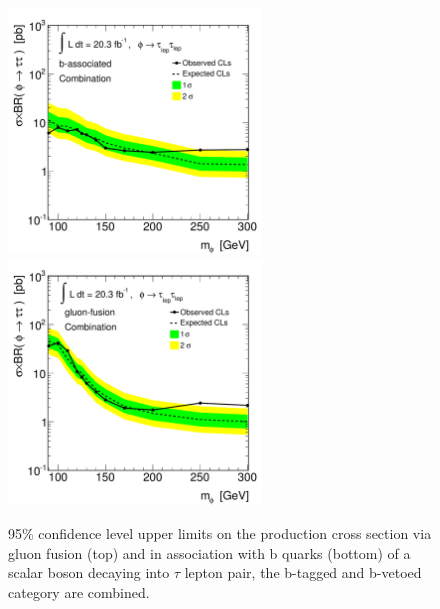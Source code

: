 \begin{figure}[tp]
  \centering
 \includegraphics[width=0.6\textwidth]{figure/limits_tesi/limit_Xsec_bbA_comb.pdf}
 \includegraphics[width=0.6\textwidth]{figure/limits_tesi/limit_Xsec_ggA_comb.pdf}
  \caption{95\% confidence level upper limits on the production cross section via gluon fusion  (top) and 
	in association with b quarks (bottom) of a scalar boson decaying into  $\tau$ lepton pair,  the b-tagged and b-vetoed category 
	are combined.}
\label{fig:limit_xs}
\end{figure}



